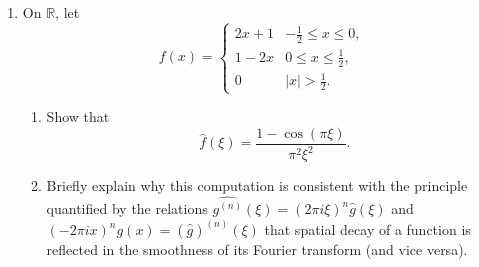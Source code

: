 \documentclass[11pt]{article}
\begin{document}
\begin{enumerate}[leftmargin=2em, label=\arabic*.]
\begin{enumerate}
            We use Fubini freely.
            Now, we verify Plancherel.
            \begin{align*}
                \int_{\R^2} |f_{r, \delta}|^2 = \frac{1}{r^2 \delta^2} \int_{\R} e^{-2x^2 / r^2} dx \int_{\R} e^{-2y^2 / \delta^2} dy = \frac{1}{r^2 \delta^2}\left( \sqrt{\frac{r^2}{2 \pi} }\right) \left( \sqrt{\frac{\delta^2}{2 \pi}}\right) = \frac{1}{r \delta} \frac{1}{2 \pi}
            .\end{align*}

            Next, we compute:
            \begin{align*}
                \int_{\R^2} |\widehat{f_{r, \delta}}|^2 = \int_{\R} \frac{1}{\pi} e^{-2\pi^2r^2\xi_x^2} d\xi_x \int_{\R} \frac{1}{\pi} e^{-2\pi^2\delta^2\xi_y^2} d\xi_y = \frac{1}{\pi} \left( \sqrt{\frac{\pi}{2 r^2}}\right) \left( \sqrt{\frac{\pi}{2 \delta^2}}\right) = \frac{1}{r \delta} \frac{1}{2\pi}
            .\end{align*}
            Thus, we have verified Plancherel's identity.


        \item If $\phi$ becomes smoother, then by theorem 5.10 5) $\hat{\phi}$ decays at least as quickly as the power of the highest degree continuous derivative.
            We can say more precisely how the frequency spectrum will decay. We don't just know that it eventually will (which is what the Riemann-Lebesuge lemma means, in having $\mathcal{F}(L^{1}) \subset C_0$).

    \end{enumerate}


    \item On $\mathbb{R}$, let
    \[
    f(x)=
    \begin{cases}
        2x+1 & -\frac{1}{2}\leq x\leq 0,\\
        1-2x & 0\leq x\leq \frac{1}{2},\\
        0 & |x|>\frac{1}{2}.
    \end{cases}
    \]

    \begin{enumerate}[label=(\alph*), leftmargin=2em]
        \item Show that
        \[
        \widehat{f}(\xi)=\frac{1-\cos(\pi \xi)}{\pi^2 \xi^2}.
        \]

        \item Briefly explain why this computation is consistent with the principle quantified by the relations
        $ \widehat{g^{(n)}}(\xi)=(2\pi i\xi)^n\widehat{g}(\xi)$
        and
        $(-2\pi i x)^n g(x) = (\widehat{g})^{(n)}(\xi)$
    that spatial decay of a function is reflected in the smoothness of its Fourier transform (and vice versa).


\end{enumerate}
\end{enumerate}
\end{document}
